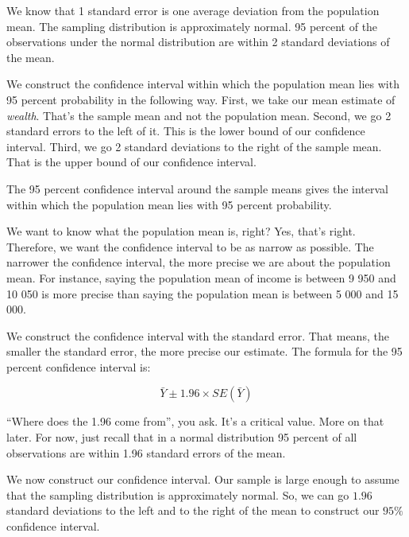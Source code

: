\documentclass[]{article}
\newenvironment{Shaded}{\begin{snugshade}}{\end{snugshade}}
\newcommand{\KeywordTok}[1]{\textcolor[rgb]{0.13,0.29,0.53}{\textbf{#1}}}
\newcommand{\FloatTok}[1]{\textcolor[rgb]{0.00,0.00,0.81}{#1}}
\newcommand{\StringTok}[1]{\textcolor[rgb]{0.31,0.60,0.02}{#1}}
\newcommand{\CommentTok}[1]{\textcolor[rgb]{0.56,0.35,0.01}{\textit{#1}}}
\newcommand{\OperatorTok}[1]{\textcolor[rgb]{0.81,0.36,0.00}{\textbf{#1}}}
\newcommand{\NormalTok}[1]{#1}
\theoremstyle{definition}
\theoremstyle{definition}
\theoremstyle{definition}
\theoremstyle{remark}
\begin{document}
We know that 1 standard error is one average deviation from the
population mean. The sampling distribution is approximately normal. 95
percent of the observations under the normal distribution are within 2
standard deviations of the mean.

We construct the confidence interval within which the population mean
lies with 95 percent probability in the following way. First, we take
our mean estimate of \emph{wealth}. That's the sample mean and not the
population mean. Second, we go 2 standard errors to the left of it. This
is the lower bound of our confidence interval. Third, we go 2 standard
deviations to the right of the sample mean. That is the upper bound of
our confidence interval.

The 95 percent confidence interval around the sample means gives the
interval within which the population mean lies with 95 percent
probability.

We want to know what the population mean is, right? Yes, that's right.
Therefore, we want the confidence interval to be as narrow as possible.
The narrower the confidence interval, the more precise we are about the
population mean. For instance, saying the population mean of income is
between 9 950 and 10 050 is more precise than saying the population mean
is between 5 000 and 15 000.

We construct the confidence interval with the standard error. That
means, the smaller the standard error, the more precise our estimate.
The formula for the 95 percent confidence interval is:

\[ \bar{Y} \pm 1.96 \times SE(\bar{Y}) \]

``Where does the 1.96 come from'', you ask. It's a critical value. More
on that later. For now, just recall that in a normal distribution 95
percent of all observations are within 1.96 standard errors of the mean.

We now construct our confidence interval. Our sample is large enough to
assume that the sampling distribution is approximately normal. So, we
can go \(1.96\) standard deviations to the left and to the right of the
mean to construct our \(95\%\) confidence interval.

\begin{Shaded}
\end{Shaded}
\end{document}
